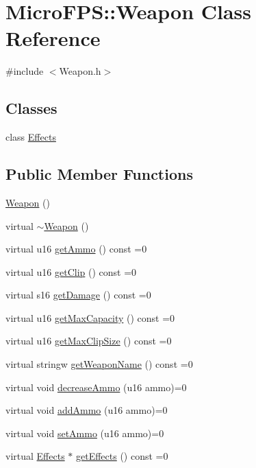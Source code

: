 \hypertarget{class_micro_f_p_s_1_1_weapon}{
\section{MicroFPS::Weapon Class Reference}
\label{dc/da6/class_micro_f_p_s_1_1_weapon}
}


{\ttfamily \#include $<$Weapon.h$>$}

\subsection*{Classes}
\begin{DoxyCompactItemize}
\item 
class \hyperlink{class_micro_f_p_s_1_1_weapon_1_1_effects}{Effects}
\end{DoxyCompactItemize}
\subsection*{Public Member Functions}
\begin{DoxyCompactItemize}
\item 
\hyperlink{class_micro_f_p_s_1_1_weapon_ae44ca13b30cf0d011cc82be7e1183ca8}{Weapon} ()
\item 
virtual \hyperlink{class_micro_f_p_s_1_1_weapon_a8e8a7e6591ef3edff8f39197001be631}{$\sim$Weapon} ()
\item 
virtual u16 \hyperlink{class_micro_f_p_s_1_1_weapon_ac6c42acd69cdfe1808c86033358a715b}{getAmmo} () const =0
\item 
virtual u16 \hyperlink{class_micro_f_p_s_1_1_weapon_a4ba6521f0ebfc3e1809ae67010c0534c}{getClip} () const =0
\item 
virtual s16 \hyperlink{class_micro_f_p_s_1_1_weapon_ad619ae94202880032139eb0cd4134e70}{getDamage} () const =0
\item 
virtual u16 \hyperlink{class_micro_f_p_s_1_1_weapon_a8bbe1026f022a0c179353d25f45a518f}{getMaxCapacity} () const =0
\item 
virtual u16 \hyperlink{class_micro_f_p_s_1_1_weapon_a299e525125412e9a4c7a60d4fea3e33b}{getMaxClipSize} () const =0
\item 
virtual stringw \hyperlink{class_micro_f_p_s_1_1_weapon_a7dfc1a991ce1433aea63767b544ae2c4}{getWeaponName} () const =0
\item 
virtual void \hyperlink{class_micro_f_p_s_1_1_weapon_aeb8e20ca29e3e54b6593fe00166c7a96}{decreaseAmmo} (u16 ammo)=0
\item 
virtual void \hyperlink{class_micro_f_p_s_1_1_weapon_afb40966eb236685373e5c7220bc9ad1c}{addAmmo} (u16 ammo)=0
\item 
virtual void \hyperlink{class_micro_f_p_s_1_1_weapon_acc61092a5e3f0d51fcab4320fc2553f6}{setAmmo} (u16 ammo)=0
\item 
virtual \hyperlink{class_micro_f_p_s_1_1_weapon_1_1_effects}{Effects} $\ast$ \hyperlink{class_micro_f_p_s_1_1_weapon_a415e5fd2b9831fb91a6ab7371a1f3094}{getEffects} () const =0
\end{DoxyCompactItemize}


